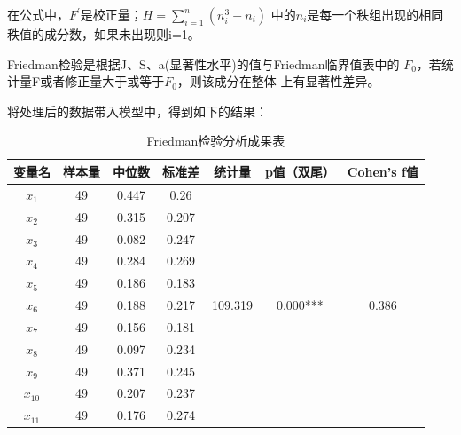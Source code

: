 \documentclass[UTF8]{ctexart}
\begin{document}
在公式中，$F^{\prime}$是校正量；$H=\sum_{i=1}^{n}(n_{i}^{3}-n_{i})$
中的$n_{i}$是每一个秩组出现的相同秩值的成分数，如果未出现则i=1。

Friedman检验是根据J、S、a(显著性水平)的值与Friedman临界值表中的
$F_{0}$，若统计量F或者修正量大于或等于$F_{0}$，则该成分在整体
上有显著性差异。

将处理后的数据带入模型中，得到如下的结果：
\begin{table}[H]
    \centering
    \caption{Friedman检验分析成果表}
    \begin{tabular}{|c|c|c|c|c|c|c|}
        \hline
        变量名   & 样本量 & 中位数 & 标准差 & 统计量                    & p值（双尾）                & Cohen's f值             \\ \hline
        $x_{1}$  & 49     & 0.447  & 0.26   & \multirow{14}{*}{109.319} & \multirow{14}{*}{0.000***} & \multirow{14}{*}{0.386} \\ \cline{1-4}
        $x_{2}$  & 49     & 0.315  & 0.207  & ~                         & ~                          & ~                       \\ \cline{1-4}
        $x_{3}$  & 49     & 0.082  & 0.247  & ~                         & ~                          & ~                       \\ \cline{1-4}
        $x_{4}$  & 49     & 0.284  & 0.269  & ~                         & ~                          & ~                       \\ \cline{1-4}
        $x_{5}$  & 49     & 0.186  & 0.183  & ~                         & ~                          & ~                       \\ \cline{1-4}
        $x_{6}$  & 49     & 0.188  & 0.217  & ~                         & ~                          & ~                       \\ \cline{1-4}
        $x_{7}$  & 49     & 0.156  & 0.181  & ~                         & ~                          & ~                       \\ \cline{1-4}
        $x_{8}$  & 49     & 0.097  & 0.234  & ~                         & ~                          & ~                       \\ \cline{1-4}
        $x_{9}$  & 49     & 0.371  & 0.245  & ~                         & ~                          & ~                       \\ \cline{1-4}
        $x_{10}$ & 49     & 0.207  & 0.237  & ~                         & ~                          & ~                       \\ \cline{1-4}
        $x_{11}$ & 49     & 0.176  & 0.274  & ~                         & ~                          & ~                       \\ \cline{1-4}

\end{tabular}
\end{table}
\end{document}
